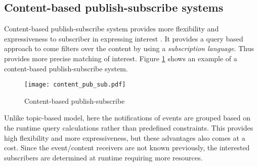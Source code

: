 \subsection{Content-based publish-subscribe systems}

Content-based publish-subscribe system provides more flexibility \parencite{Aguilera:1999:MEC:301308.301326} and expressiveness to subscriber in expressing interest \parencite{Shen2010}. It provides a query based approach to come filters over the content by using a \textit {subscription language}. Thus provides more precise matching of interest. Figure \ref{figures:content_pub_sub} shows an example of a content-based publish-subscribe system.

    \begin{figure}[h!]
    \centering
    \texttt{[image: content\_pub\_sub.pdf]}
    \caption{Content-based publish-subscribe}\label{figures:content_pub_sub}
    \end{figure}

Unlike topic-based model, here the notifications of events are grouped based on the runtime query calculations rather than predefined constraints. This provides high flexibility and more expressiveness, but these advantages also comes at a cost. Since the event/content receivers are not known previously, the interested subscribers are determined at runtime requiring more resources.  


